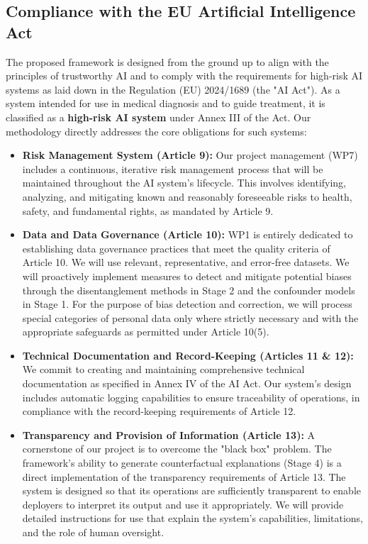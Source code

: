 \documentclass[11pt, a4paper]{article}
\begin{document}
\subsection{Compliance with the EU Artificial Intelligence Act}
The proposed framework is designed from the ground up to align with the principles of trustworthy AI and to comply with the requirements for high-risk AI systems as laid down in the Regulation (EU) 2024/1689 (the "AI Act"). As a system intended for use in medical diagnosis and to guide treatment, it is classified as a \textbf{high-risk AI system} under Annex III of the Act. Our methodology directly addresses the core obligations for such systems:

\begin{itemize}
    \item \textbf{Risk Management System (Article 9):} Our project management (WP7) includes a continuous, iterative risk management process that will be maintained throughout the AI system's lifecycle. This involves identifying, analyzing, and mitigating known and reasonably foreseeable risks to health, safety, and fundamental rights, as mandated by Article 9.

    \item \textbf{Data and Data Governance (Article 10):} WP1 is entirely dedicated to establishing data governance practices that meet the quality criteria of Article 10. We will use relevant, representative, and error-free datasets. We will proactively implement measures to detect and mitigate potential biases through the disentanglement methods in Stage 2 and the confounder models in Stage 1. For the purpose of bias detection and correction, we will process special categories of personal data only where strictly necessary and with the appropriate safeguards as permitted under Article 10(5).

    \item \textbf{Technical Documentation and Record-Keeping (Articles 11 \& 12):} We commit to creating and maintaining comprehensive technical documentation as specified in Annex IV of the AI Act. Our system's design includes automatic logging capabilities to ensure traceability of operations, in compliance with the record-keeping requirements of Article 12.

    \item \textbf{Transparency and Provision of Information (Article 13):} A cornerstone of our project is to overcome the "black box" problem. The framework's ability to generate counterfactual explanations (Stage 4) is a direct implementation of the transparency requirements of Article 13. The system is designed so that its operations are sufficiently transparent to enable deployers to interpret its output and use it appropriately. We will provide detailed instructions for use that explain the system's capabilities, limitations, and the role of human oversight.


\end{itemize}
\end{document}
